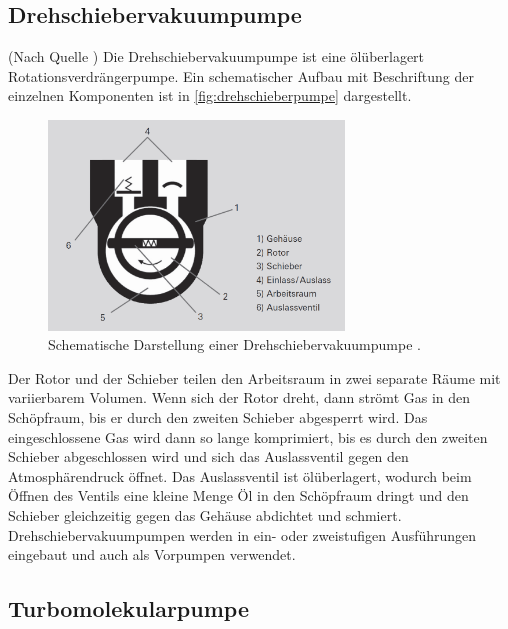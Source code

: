\subsection{Drehschiebervakuumpumpe}
\label{subsec:Drehschieberpumpe}

(Nach Quelle \cite{Drehschiebervakuumpumpen}) Die Drehschiebervakuumpumpe ist eine ölüberlagert Rotationsverdrängerpumpe. Ein schematischer Aufbau mit Beschriftung der einzelnen Komponenten ist in \autoref{fig:drehschieberpumpe} dargestellt.

\begin{figure}[H]
    \centering
    \includegraphics[width=0.7\textwidth]{data/drehschieberpumpe.png}
    \caption{Schematische Darstellung einer Drehschiebervakuumpumpe \cite{Drehschiebervakuumpumpen}.}
    \label{fig:drehschieberpumpe}
\end{figure}

\noindent
Der Rotor und der Schieber teilen den Arbeitsraum in zwei separate Räume mit variierbarem Volumen. Wenn sich der Rotor dreht, dann strömt Gas in den Schöpfraum, bis er durch den zweiten Schieber abgesperrt wird. Das eingeschlossene Gas wird dann so lange komprimiert, bis es durch den zweiten Schieber 
abgeschlossen wird und sich das Auslassventil gegen den Atmosphärendruck öffnet. Das Auslassventil ist ölüberlagert, wodurch beim Öffnen des Ventils eine kleine Menge Öl in den Schöpfraum dringt und den Schieber gleichzeitig gegen das Gehäuse abdichtet und schmiert.
Drehschiebervakuumpumpen werden in ein- oder zweistufigen Ausführungen eingebaut und auch als Vorpumpen verwendet.

\subsection{Turbomolekularpumpe}
\label{subsec:turbopumpe}

